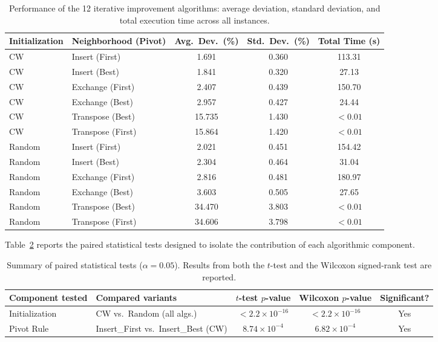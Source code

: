 \documentclass[11pt, a4paper]{article}
\begin{document}
\begin{table}[h]
\centering
\caption{Performance of the 12 iterative improvement algorithms: average deviation, standard deviation, and total execution time across all instances.}
\label{tab:results}
\begin{tabular}{llccc}
\toprule
\textbf{Initialization} & \textbf{Neighborhood (Pivot)} & \textbf{Avg.\ Dev.\ (\%)} & \textbf{Std.\ Dev.\ (\%)} & \textbf{Total Time (s)} \\
\midrule
CW     & Insert (First)    & 1.691 & 0.360 & 113.31 \\
CW     & Insert (Best)     & 1.841 & 0.320 & 27.13  \\
CW     & Exchange (First)  & 2.407 & 0.439 & 150.70 \\
CW     & Exchange (Best)   & 2.957 & 0.427 & 24.44  \\
CW     & Transpose (Best)  & 15.735 & 1.430 & $<0.01$ \\
CW     & Transpose (First) & 15.864 & 1.420 & $<0.01$ \\
\midrule
Random & Insert (First)    & 2.021 & 0.451 & 154.42 \\
Random & Insert (Best)     & 2.304 & 0.464 & 31.04  \\
Random & Exchange (First)  & 2.816 & 0.481 & 180.97 \\
Random & Exchange (Best)   & 3.603 & 0.505 & 27.65  \\
Random & Transpose (Best)  & 34.470 & 3.803 & $<0.01$ \\
Random & Transpose (First) & 34.606 & 3.798 & $<0.01$ \\
\bottomrule
\end{tabular}
\end{table}

Table~\ref{tab:tests} reports the paired statistical tests designed to isolate the contribution of each algorithmic component.

\begin{table}[h]
\centering
\caption{Summary of paired statistical tests ($\alpha = 0.05$). Results from both the $t$-test and the Wilcoxon signed-rank test are reported.}
\label{tab:tests}
\begin{tabular}{llccc}
\toprule
\textbf{Component tested} & \textbf{Compared variants} & \textbf{$t$-test $p$-value} & \textbf{Wilcoxon $p$-value} & \textbf{Significant?} \\
\midrule
Initialization   & CW vs.\ Random (all algs.)  & $< 2.2 \times 10^{-16}$ & $< 2.2 \times 10^{-16}$ & Yes \\
Pivot Rule       & Insert\_First vs.\ Insert\_Best (CW) & $8.74 \times 10^{-4}$ & $6.82 \times 10^{-4}$ & Yes \\
\bottomrule
\end{tabular}
\end{table}
\end{document}
